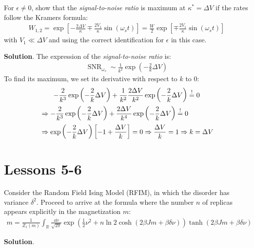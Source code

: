 \documentclass[../template.tex]{subfiles}
\begin{document}
\begin{exo}
    For $\epsilon \neq 0$, show that the \textit{signal-to-noise ratio} is maximum at $\kappa^* = \Delta V$ if the rates follow the Kramers formula:
    \begin{align*}
        W_{1,2} = \exp\left[-\frac{2 \Delta V}{\kappa} \mp \frac{2V_1}{\kappa} \sin(\omega_s t)  \right] = \frac{W}{2} \exp\left[\mp \frac{2V_1}{\kappa} \sin(\omega_s t) \right] 
    \end{align*} 
    with $V_1 \ll \Delta V$ and using the correct identification for $\epsilon$ in this case.

    \medskip

    \textbf{Solution}. The expression of the \textit{signal-to-noise ratio} is:
    \begin{align*}
        \operatorname{SNR}_{\omega_s} \sim \frac{1}{k^2} \exp\left(-\frac{2}{k} \Delta V\right)  
    \end{align*} 
    To find its maximum, we set its derivative with respect to $k$ to $0$:
    \begin{align*}
        -\frac{2}{k^3} \exp\left(-\frac{2}{k} \Delta V \right) +\frac{1}{k^2}\frac{2\Delta V}{k^2} \exp\left(-\frac{2}{k} \Delta V \right)  \overset{!}{=} 0 \span\\
        &\Rightarrow -\frac{2}{k^3} \exp\left(-\frac{2}{k} \Delta V \right)  + \frac{2 \Delta V}{k^4}  \exp\left(-\frac{2}{k} \Delta V \right) \overset{!}{=} 0\\
        &\Rightarrow \exp\left(-\frac{2}{k} \Delta V \right) \left[-1 + \frac{\Delta V}{k} \right] = 0 \Rightarrow \frac{\Delta V}{k} = 1 \Rightarrow k = \Delta V 
    \end{align*}
\end{exo}

\chapter{Lessons 5-6}

\begin{exo}
    Consider the Random Field Ising Model (RFIM), in which the disorder has variance $\delta^2$. Proceed to arrive at the formula where the number $n$ of replicas appears explicitly in the magnetization $m$:
    \begin{align*}
        m = \frac{1}{Z_1(m)} \int_{\mathbb{R}} \frac{\dd{\nu}}{\sqrt{2 \pi}} \exp\left(\frac{1}{2} \nu^2 + n\ln 2 \cosh(2 \beta J m + \beta \delta \nu)  \right)   \tanh(2 \beta Jm + \beta \delta \nu)
    \end{align*}

    \medskip

    \textbf{Solution}. 
\end{exo}
\end{document}
